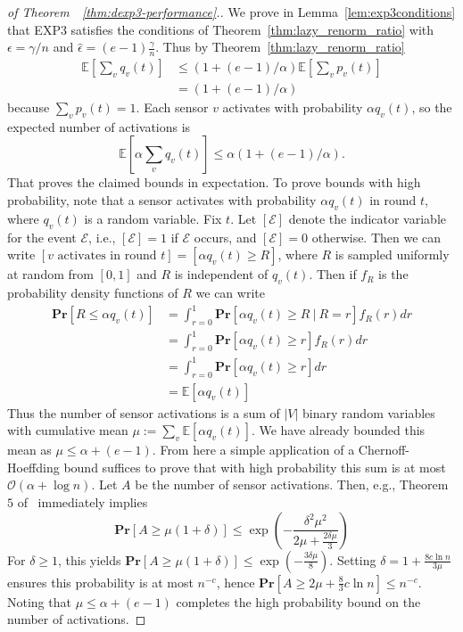 \documentclass{sig-alternate-dan}
\numberwithin{equation}{section}
\newcommand{\algofont}[1]{\textsc{#1}}
\newcommand{\cO}{\mathcal{O}}
\newcommand{\EXPthree}{{\algofont{EXP3}}\xspace}
\newcommand{\numsensors}{\ensuremath{n}}
\newcommand{\sensor}{\ensuremath{v}}
\newcommand{\sensors}{V}
\newcommand{\event}{\ensuremath{\mathcal{E}}}
\newcommand{\paren} [1] {\ensuremath{ \left( {#1} \right) }}
\newcommand{\prob}[1]{\ensuremath{\mathbf{Pr}\left[#1\right] }}
\newcommand{\E}[1]{\ensuremath{\mathbb{E}\left[#1\right] }}
\begin{document}
{\begin{proof}[of Theorem~~\ref{thm:dexp3-performance}.]
%
%
%
%
%
We prove in Lemma~\ref{lem:exp3conditions} that \EXPthree satisfies
the conditions of Theorem~\ref{thm:lazy_renorm_ratio} 
with $\epsilon = \gamma/\numsensors$ and $\hat{\epsilon} =
(e-1)\frac{\gamma}{\numsensors}$.  Thus by Theorem~\ref{thm:lazy_renorm_ratio} 
\begin{align*}
\E{\sum_{\sensor} q_{\sensor}(t)} & \le \paren{1 +
  (e-1)/\alpha}\E{\sum_{\sensor} p_{\sensor}(t)}\\ & = \paren{1 +
  (e-1)/\alpha} 
\end{align*}
because $\sum_{\sensor} p_{\sensor}(t) = 1$.
Each sensor $\sensor$ activates with probability $\alpha q_{\sensor}(t)$,
so the expected number of activations is 
\[
\E{\alpha \sum_{\sensor} q_{\sensor}(t)} \le \alpha\paren{1 +
  (e-1)/\alpha}\mbox{.}
\]
%
That proves the claimed bounds in expectation.  To prove bounds with
high probability, note that a sensor activates with probability
$\alpha q_{\sensor}(t)$ in round $t$, where   $q_{\sensor}(t)$ is a
random variable.
Fix $t$.  Let $[\event]$ denote the indicator variable
for the event $\event$, i.e., $[\event] = 1$ if $\event$ occurs, and
$[\event] = 0$ otherwise.  Then we can write 
$[\sensor \text{ activates in round }t] = [\alpha
q_{\sensor}(t) \ge R]$, where $R$ is sampled uniformly at random from
$[0,1]$ and $R$ is independent of $q_{\sensor}(t)$.
Then if $f_R$ is the probability density functions of $R$ we can write 
\[
\begin{aligned}
   \prob{R \le \alpha q_{\sensor}(t)} & = \int_{r = 0}^1 \prob{\alpha
q_{\sensor}(t) \ge R \ |\  R = r} f_R(r) dr\\
  & = \int_{r = 0}^1 \prob{\alpha q_{\sensor}(t) \ge r} f_R(r) dr \\
& = \int_{r = 0}^1 \prob{\alpha q_{\sensor}(t) \ge r}dr \\
& = \E{ \alpha q_{\sensor}(t) }
\end{aligned}
\]
Thus the number of sensor activations is a sum of $|\sensors|$ binary
random variables with cumulative mean 
$\mu := \sum_{\sensor}  \E{ \alpha q_{\sensor}(t) }$.
We have already bounded this mean as $\mu \le \alpha + (e-1)$.
From here a simple application of a Chernoff-Hoeffding bound suffices
to prove that with high probability this sum is at most 
$\cO(\alpha + \log n)$.  Let $A$ be the number of sensor activations.
Then, e.g., Theorem~$5$ of~\cite{CL06} 
immediately implies 
\[
\prob{A \ge \mu(1 + \delta)} \le \exp \paren{ - \frac{\delta^2
    \mu^2}{2 \mu + \frac{2\delta \mu}{3}}}
\]
For $\delta \ge 1$, this yields 
$\prob{A \ge \mu(1 + \delta)} \le \exp \paren{ -
  \frac{3\delta\mu}{8}}$.
Setting $\delta = 1 + \frac{8c\ln n}{3\mu}$ ensures this probability is
at most $n^{-c}$, hence 
$\prob{A \ge 2\mu + \frac{8}{3}c\ln n} \le n^{-c}$.
Noting that $\mu \le \alpha + (e-1)$ completes the high probability
bound on the number of activations.



\end{proof}}
\end{document}
